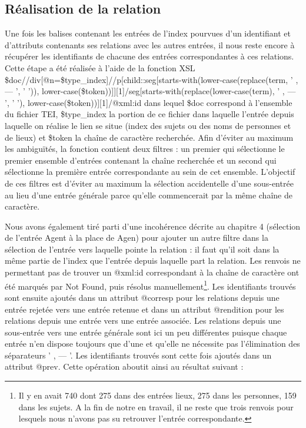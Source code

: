 \documentclass[a4paper,12pt,twoside]{book}
\begin{document}
	\subsection{Réalisation de la relation}
	
	Une fois les balises contenant les entrées de l'index pourvues d'un identifiant et d'attributs contenants ses relations avec les autres entrées, il nous reste encore à récupérer les identifiants de chacune des entrées correspondantes à ces relations. Cette étape a été réalisée à l'aide de la fonction XSL \og \$doc//div[@n=\$type\_index]//p[child::seg[starts-with(lower-case(replace(term, ' , — ', ' ')), lower-case(\$token))]][1]/seg[starts-with(replace(lower-case(term), ' , — ', ' '), lower-case(\$token))][1]/@xml:id\fg{} dans lequel \$doc correspond à l'ensemble du fichier TEI, \$type\_index la portion de ce fichier dans laquelle l'entrée depuis laquelle on réalise le lien se situe (index des sujets ou des noms de personnes et de lieux) et \$token la chaîne de caractère recherchée. Afin d'éviter au maximum les ambiguïtés, la fonction contient deux filtres : un premier qui sélectionne le premier ensemble d'entrées contenant la chaîne recherchée et un second qui sélectionne la première entrée correspondante au sein de cet ensemble. L'objectif de ces filtres est d'éviter au maximum la sélection accidentelle d'une sous-entrée au lieu d'une entrée générale parce qu'elle commencerait par la même chaîne de caractère.
	
	Nous avons également tiré parti d'une incohérence décrite au chapitre 4 (sélection de l'entrée \og Agent\fg{} à la place de \og Agen\fg{}) pour ajouter un autre filtre dans la sélection de l'entrée vers laquelle pointe la relation : il faut qu'il soit dans la même partie de l'index que l'entrée depuis laquelle part la relation. Les renvois ne permettant pas de trouver un @xml:id correspondant à la chaîne de caractère ont été marqués par \og Not Found\fg{}, puis résolus manuellement\footnote{Il y en avait 740 dont 275 dans des entrées lieux, 275 dans les personnes, 159 dans les sujets. A la fin de notre en travail, il ne reste que trois renvois pour lesquels nous n'avons pas su retrouver l'entrée correspondante.}. Les identifiants trouvés sont ensuite ajoutés dans un attribut @corresp pour les relations depuis une entrée rejetée vers une entrée retenue et dans un attribut @rendition pour les relations depuis une entrée vers une entrée associée. Les relations depuis une sous-entrée vers une entrée générale sont ici un peu différentes puisque chaque entrée n'en dispose toujours que d'une et qu'elle ne nécessite pas l'élimination des séparateurs ' , — '. Les identifiants trouvés sont cette fois ajoutés dans un attribut @prev. Cette opération aboutit ainsi au résultat suivant :
	
\end{document}
